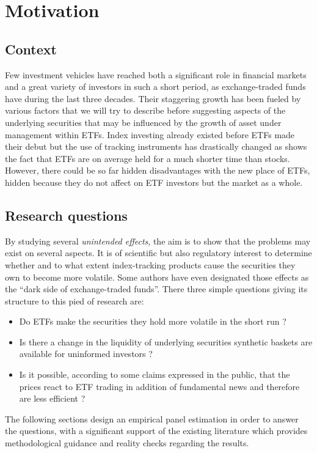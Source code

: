 \section{Motivation}
\label{sec:Motivation}
\subsection{Context}
Few investment vehicles have reached both a significant role in financial markets and a great variety of investors in such a short period, as exchange-traded funds have during the last three decades. Their staggering growth has been fueled by various factors that we will try to describe before suggesting aspects of the underlying securities that may be influenced by the growth of asset under management within ETFs. Index investing already existed before ETFs made their debut but the use of tracking instruments has drastically changed as shows the fact that ETFs are on average held for a much shorter time than stocks. However, there could be so far hidden disadvantages with the new place of ETFs, hidden because they do not affect on ETF investors but the market as a whole.

\subsection{Research questions}
By studying several \emph{unintended effects}, the aim is to show that the problems may exist on several aspects. It is of scientific but also regulatory interest to determine whether and to what extent index-tracking products cause the securities they own to become more volatile. Some authors have even designated those effects as the ``dark side of exchange-traded funds''. There three simple questions giving its structure to this pied of research are:
\begin{itemize}
\item Do ETFs make the securities they hold more volatile in the short run ?
\item Is there a change in the liquidity of underlying securities synthetic baskets are available for uninformed investors ?
  \item Is it possible, according to some claims expressed in the public, that the prices react to ETF trading in addition of fundamental news and therefore are less efficient ? 
\end{itemize}
The following sections design an empirical panel estimation in order to answer the questions, with a significant support of the existing literature which provides methodological guidance and reality checks regarding the results.

